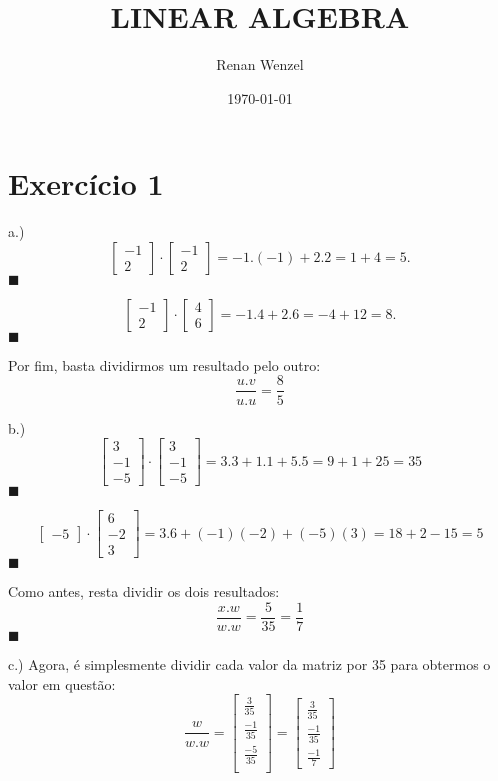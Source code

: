 \documentclass{article}
\title{LINEAR ALGEBRA}
\author{Renan Wenzel}
\date{\today}
\renewcommand\qedsymbol{$\blacksquare$}
\begin{document}
  \section*{Exerc\'icio 1} 
  a.) 
  \[ 
    \begin{bmatrix}
      -1 \\
      2
    \end{bmatrix}
    \cdot 
    \begin{bmatrix}
        -1 \\
        2
    \end{bmatrix} 
    = -1.(-1) + 2.2 = 1 + 4 = 5. 
  \] 
  \qedsymbol 

  \[ 
  \begin{bmatrix}
   -1 \\
   2
  \end{bmatrix}
  \cdot
  \begin{bmatrix}
    4 \\
    6
  \end{bmatrix}
  = -1.4 + 2.6 = -4 + 12 = 8. 
  \]
  \qedsymbol

  Por fim, basta dividirmos um resultado pelo outro:
  $$
    \frac{u.v}{u.u} = \frac{8}{5}
  $$

  b.)
  $$
    \begin{bmatrix}
      3 \\
      -1 \\ 
      -5
    \end{bmatrix}
    \cdot
    \begin{bmatrix}
      3 \\
      -1 \\
      -5
    \end{bmatrix}
  = 3.3 + 1.1 + 5.5 = 9 + 1 + 25 = 35
  $$ \qedsymbol

  $$
  \begin{bmatrix}
    -5 
  \end{bmatrix}
  \cdot
  \begin{bmatrix}
    6 \\
    -2 \\
    3
  \end{bmatrix}
  = 3.6 + (-1)(-2) + (-5)(3) = 18 + 2 - 15 = 5
  $$\qedsymbol
 
  Como antes, resta dividir os dois resultados:
  $$
    \frac{x.w}{w.w} = \frac{5}{35} = \frac{1}{7}
  $$ \qedsymbol

  c.) Agora, \'e simplesmente dividir cada valor da matriz por 35 para obtermos o valor em quest\~ao:
  $$
    \frac{w}{w.w} = \begin{bmatrix}
      \frac{3}{35} \\
      \frac{-1}{35} \\
      \frac{-5}{35} \\
    \end{bmatrix} = \begin{bmatrix}
      \frac{3}{35} \\
      \frac{-1}{35} \\
      \frac{-1}{7}
    \end{bmatrix}
  $$
\end{document}
